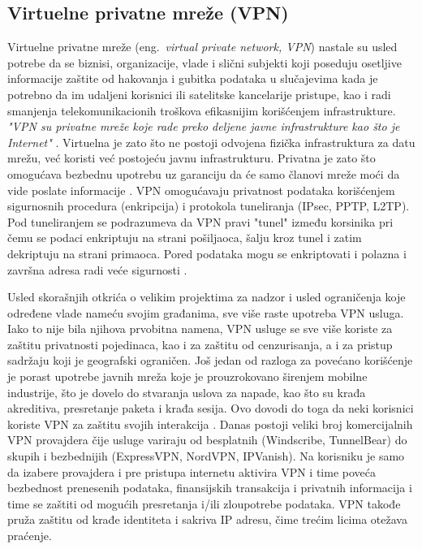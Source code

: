 \documentclass[a4paper]{article}
\begin{document}
\subsection{Virtuelne privatne mreže (VPN)}
\label{subsec:vpn}

Virtuelne privatne mreže (eng.~{\em virtual private network, VPN}) nastale su usled potrebe da se biznisi, organizacije, vlade i slični subjekti koji poseduju osetljive informacije zaštite od hakovanja i gubitka podataka u slučajevima kada je potrebno da im udaljeni korisnici ili satelitske kancelarije pristupe, kao i radi smanjenja telekomunikacionih troškova efikasnijim korišćenjem infrastrukture.\textit{ "VPN su privatne mreže koje rade preko deljene javne infrastrukture kao što je Internet"} \cite{vpn2}. Virtuelna je zato što ne postoji odvojena fizička infrastruktura za datu mrežu, već koristi već postojeću javnu infrastrukturu. Privatna je zato što  omogućava bezbednu upotrebu uz garanciju da će samo članovi mreže moći da vide poslate informacije \cite{vpn3}. VPN omogućavaju privatnost podataka korišćenjem sigurnosnih procedura (enkripcija) i protokola tuneliranja (IPsec, PPTP, L2TP). Pod tuneliranjem se podrazumeva da VPN pravi "tunel"  između korsinika pri čemu se podaci enkriptuju na strani pošiljaoca, šalju kroz tunel i zatim dekriptuju na strani primaoca. Pored podataka mogu se enkriptovati i polazna i završna adresa radi veće sigurnosti \cite{vpn4}. 
\par Usled skorašnjih otkrića o velikim projektima za nadzor i usled ograničenja koje određene vlade nameću svojim građanima, sve više raste upotreba VPN usluga. Iako to nije bila njihova prvobitna namena, VPN usluge se sve više koriste za zaštitu privatnosti pojedinaca, kao i za zaštitu od cenzurisanja, a i za pristup sadržaju koji je geografski ograničen. Još jedan od razloga za povećano korišćenje je porast upotrebe javnih mreža koje je prouzrokovano širenjem mobilne industrije, što je dovelo do stvaranja uslova za napade, kao što su krađa akreditiva, presretanje paketa i krađa sesija. Ovo dovodi do toga da neki korisnici koriste VPN za zaštitu svojih interakcija \cite{vpn5}. Danas postoji veliki broj komercijalnih VPN provajdera čije usluge variraju od besplatnih (Windscribe, TunnelBear) do skupih i bezbednijih (ExpressVPN, NordVPN, IPVanish). Na korisniku je samo da izabere provajdera i pre pristupa internetu aktivira VPN i time poveća bezbednost prenesenih podataka, finansijskih transakcija i privatnih informacija i time se zaštiti od mogućih presretanja i/ili zloupotrebe podataka. VPN takođe pruža zaštitu od krađe identiteta i sakriva IP adresu, čime trećim licima otežava praćenje. 
\end{document}
